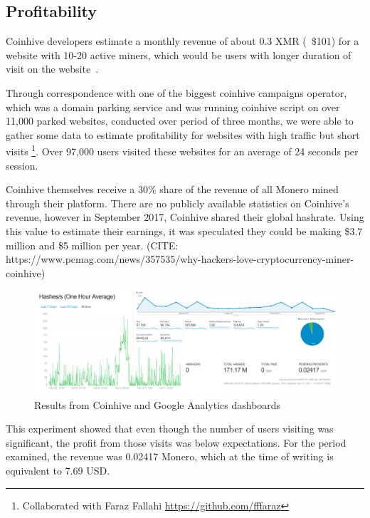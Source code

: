 \subsection{Profitability}
\label{profitabilitexperiment}

Coinhive developers estimate a monthly revenue of about 0.3 XMR (~\$101) for a website with 10-20 active miners, which would be users with longer duration of visit on the website~\cite{coinhive}.

Through correspondence with one of the biggest coinhive campaigns operator, which was a domain parking service and was running coinhive script on over 11,000 parked websites, conducted over period of three months, we were able to gather some data to estimate profitability for websites with high traffic but short visits \footnote{Collaborated with Faraz Fallahi \url{https://github.com/fffaraz}}. Over 97,000 users visited these websites for an average of 24 seconds per session.

Coinhive themselves receive a 30\% share of the revenue of all Monero mined through their platform. There are no publicly available statistics on Coinhive's revenue, however in September 2017, Coinhive shared their global hashrate. Using this value to estimate their earnings, it was speculated they could be making \$3.7 million and \$5 million per year. (CITE: https://www.pcmag.com/news/357535/why-hackers-love-cryptocurrency-miner-coinhive)

\begin{figure}[t]
\centering
\includegraphics[width=\linewidth]{figures/coinhive_experiment_11k.png}
\caption{Results from Coinhive and Google Analytics dashboards}
\end{figure}

This experiment showed that even though the number of users visiting was significant, the profit from those visits was below expectations. For the period examined, the revenue was 0.02417 Monero, which at the time of writing is equivalent to 7.69 USD.




